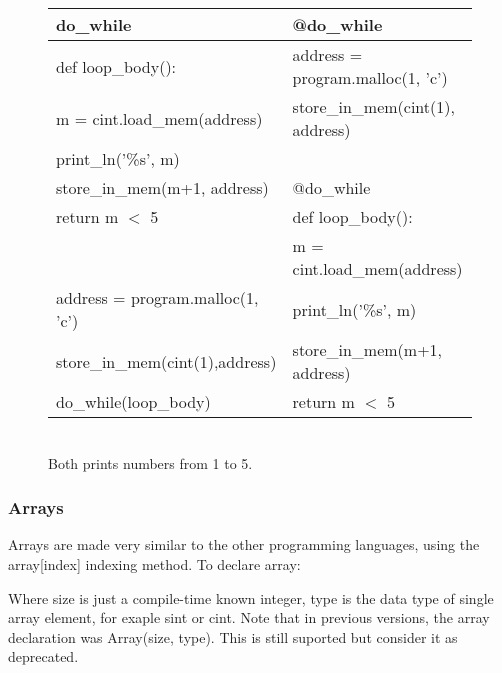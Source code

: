 \begin{figure}[h!]
\centering
\begin{tabular}{|l|l|} \hline
\textbf{do_while}                        & \textbf{@do_while}                       \\ \hline
def loop_body():                         & address = program.malloc(1, 'c')         \\
\hspace{5 mm}m = cint.load_mem(address)  & store_in_mem(cint(1), address)           \\
\hspace{5 mm}print_ln('\%s', m)          &                                          \\
\hspace{5 mm}store_in_mem(m+1, address)  & @do_while                                \\
\hspace{5 mm}return m $<$ 5              & def loop_body():                         \\
                                         & \hspace{5 mm}m = cint.load_mem(address)  \\
address = program.malloc(1, 'c')         & \hspace{5 mm}print_ln('\%s', m)          \\
store_in_mem(cint(1),address)            & \hspace{5 mm}store_in_mem(m+1, address)  \\
do_while(loop_body)                      & \hspace{5 mm}return m $<$ 5              \\ \hline
\end{tabular}
\begin{footnotesize}
\\ Both prints numbers from 1 to 5.
\end{footnotesize}
\end{figure}

\newpage

\subsubsection{Arrays}
Arrays are made very similar to the other programming languages, using the array[index] indexing method. To declare array: 

Where size is just a compile-time known integer, type is the data type of single array element, for exaple sint or cint. Note that in previous versions, the array declaration was Array(size, type). This is still suported but consider it as deprecated.

